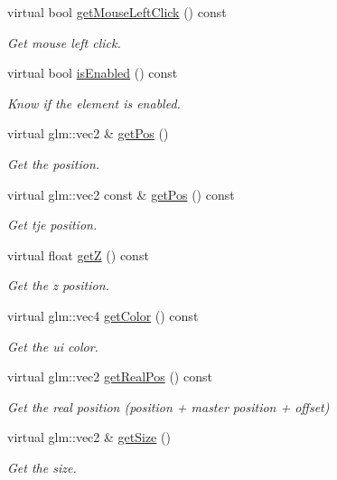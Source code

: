 \begin{DoxyCompactItemize}
virtual bool \hyperlink{class_a_base_u_i_a551e7a67ca99714da946f23b42ee1e28}{get\+Mouse\+Left\+Click} () const
\begin{DoxyCompactList}\small\item\em Get mouse left click. \end{DoxyCompactList}\item 
virtual bool \hyperlink{class_a_base_u_i_aa90944d0bcf7a97a649c126f8b07aad1}{is\+Enabled} () const
\begin{DoxyCompactList}\small\item\em Know if the element is enabled. \end{DoxyCompactList}\item 
virtual glm\+::vec2 \& \hyperlink{class_a_base_u_i_ad875929db54fdd563cbb037cade3c009}{get\+Pos} ()
\begin{DoxyCompactList}\small\item\em Get the position. \end{DoxyCompactList}\item 
virtual glm\+::vec2 const  \& \hyperlink{class_a_base_u_i_a4a8695c227cd33f47536624a55b82381}{get\+Pos} () const
\begin{DoxyCompactList}\small\item\em Get tje position. \end{DoxyCompactList}\item 
virtual float \hyperlink{class_a_base_u_i_a6759fcda967331612b30f5a473f76da2}{getZ} () const
\begin{DoxyCompactList}\small\item\em Get the z position. \end{DoxyCompactList}\item 
virtual glm\+::vec4 \hyperlink{class_a_base_u_i_a88045d863a2736eac2200918b0268187}{get\+Color} () const
\begin{DoxyCompactList}\small\item\em Get the ui color. \end{DoxyCompactList}\item 
virtual glm\+::vec2 \hyperlink{class_a_base_u_i_a0a2e25b071fe59343e2df625482cbb0f}{get\+Real\+Pos} () const
\begin{DoxyCompactList}\small\item\em Get the real position (position + master position + offset) \end{DoxyCompactList}\item 
virtual glm\+::vec2 \& \hyperlink{class_a_base_u_i_a37f4e73da2daf08bf977077f3e827689}{get\+Size} ()
\begin{DoxyCompactList}\small\item\em Get the size. \end{DoxyCompactList}\item 

\end{DoxyCompactItemize}

